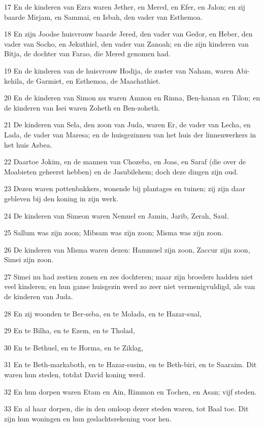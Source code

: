 \par 17 En de kinderen van Ezra waren Jether, en Mered, en Efer, en Jalon; en zij baarde Mirjam, en Sammai, en Isbah, den vader van Esthemoa.
\par 18 En zijn Joodse huisvrouw baarde Jered, den vader van Gedor, en Heber, den vader van Socho, en Jekuthiel, den vader van Zanoah; en die zijn kinderen van Bitja, de dochter van Farao, die Mered genomen had.
\par 19 En de kinderen van de huisvrouw Hodija, de zuster van Naham, waren Abi-kehila, de Garmiet, en Esthemoa, de Maachathiet.
\par 20 En de kinderen van Simon nu waren Amnon en Rinna, Ben-hanan en Tilon; en de kinderen van Isei waren Zoheth en Ben-zoheth.
\par 21 De kinderen van Sela, den zoon van Juda, waren Er, de vader van Lecha, en Lada, de vader van Maresa; en de huisgezinnen van het huis der linnenwerkers in het huis Asbea.
\par 22 Daartoe Jokim, en de mannen van Chozeba, en Joas, en Saraf (die over de Moabieten geheerst hebben) en de Jasubilehem; doch deze dingen zijn oud.
\par 23 Dezen waren pottenbakkers, wonende bij plantages en tuinen; zij zijn daar gebleven bij den koning in zijn werk.
\par 24 De kinderen van Simeon waren Nemuel en Jamin, Jarib, Zerah, Saul.
\par 25 Sallum was zijn zoon; Mibsam was zijn zoon; Misma was zijn zoon.
\par 26 De kinderen van Misma waren dezen: Hammuel zijn zoon, Zaccur zijn zoon, Simei zijn zoon.
\par 27 Simei nu had zestien zonen en zes dochteren; maar zijn broeders hadden niet veel kinderen; en hun ganse huisgezin werd zo zeer niet vermenigvuldigd, als van de kinderen van Juda.
\par 28 En zij woonden te Ber-seba, en te Molada, en te Hazar-sual,
\par 29 En te Bilha, en te Ezem, en te Tholad,
\par 30 En te Bethuel, en te Horma, en te Ziklag,
\par 31 En te Beth-markaboth, en te Hazar-susim, en te Beth-biri, en te Saaraim. Dit waren hun steden, totdat David koning werd.
\par 32 En hun dorpen waren Etam en Ain, Rimmon en Tochen, en Asan; vijf steden.
\par 33 En al haar dorpen, die in den omloop dezer steden waren, tot Baal toe. Dit zijn hun woningen en hun geslachtsrekening voor hen.
